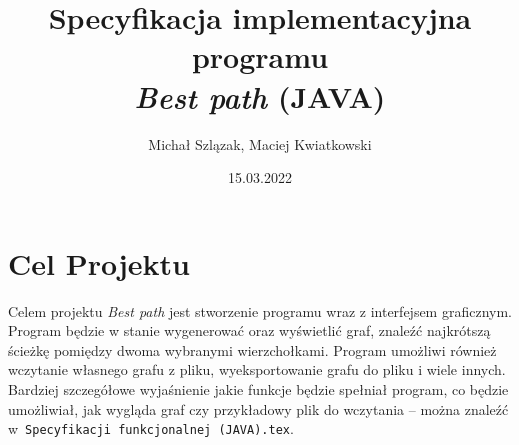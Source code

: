 \documentclass[12pt, a4paper]{article}
\begin{document}
\title{Specyfikacja implementacyjna programu\\ \textit{Best path} (JAVA)}
\date{15.03.2022}
\author{Michał Szlązak, Maciej Kwiatkowski}
\maketitle
\tableofcontents
\thispagestyle{empty}
\cleardoublepage

\newpage

\setcounter{page}{1}

\section{Cel Projektu}
Celem projektu \textit{Best path} jest stworzenie programu wraz z interfejsem graficznym. Program będzie w stanie wygenerować oraz wyświetlić graf, znaleźć najkrótszą ścieżkę pomiędzy dwoma wybranymi wierzchołkami. Program umożliwi również wczytanie własnego grafu z pliku, wyeksportowanie grafu do pliku i wiele innych. Bardziej szczegółowe wyjaśnienie jakie funkcje będzie spełniał program, co będzie umożliwiał, jak wygląda graf czy przykładowy plik do wczytania -- można znaleźć w~\texttt{Specyfikacji funkcjonalnej (JAVA).tex}.
\end{document}
